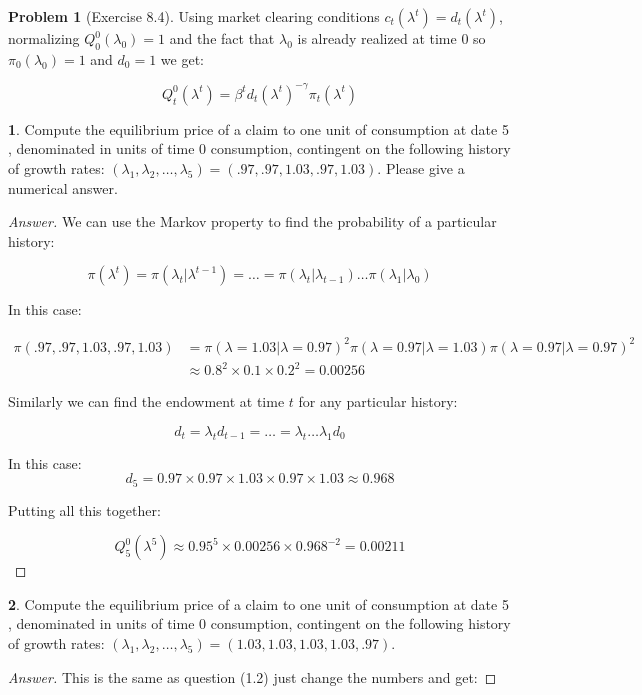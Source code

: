 \documentclass[12pt]{article}
\theoremstyle{definition}
\newtheorem{problem}{Problem}
\newtheorem{subproblem}{}[problem]
\begin{document}
\begin{problem}[Exercise 8.4]
Using market clearing conditions $c_t(\lambda^t) = d_t(\lambda^t)$, normalizing $Q^0_0(\lambda_0)=1$ and the fact that $\lambda_0$ is already realized at time $0$ so $\pi_{0}\left(\lambda_0\right) =1$ and $d_0= 1$ we get:

\begin{equation}\tag{1}\label{prices}
Q^0_t(\lambda^t) =  \beta^{t} d_{t}\left(\lambda^{t}\right)^{-\gamma} \pi_{t}\left(\lambda^{t}\right)
\end{equation}
 
\begin{subproblem}
Compute the equilibrium price of a claim to one unit of consumption at date 5 , denominated in units of time 0 consumption, contingent on the following history of growth rates: $\left(\lambda_{1}, \lambda_{2}, \ldots, \lambda_{5}\right)=(.97, .97,1.03, .97,1.03) .$ Please give a numerical answer.
\end{subproblem}

\begin{proof}[Answer]
We can use the Markov property to find the probability of a particular history:

$$\pi(\lambda^t) = \pi(\lambda_t|\lambda^{t-1})=\dots=\pi(\lambda_t|\lambda_{t-1})\dots\pi(\lambda_1|\lambda_{0})$$

In this case:

\begin{align*}
    \pi(.97, .97,1.03, .97, 1.03) &= \pi(\lambda = 1.03|\lambda = 0.97)^2\pi(\lambda = 0.97|\lambda = 1.03)\pi(\lambda = 0.97|\lambda = 0.97)^2\\
    & \approx 0.8^2 \times 0.1 \times 0.2^2 = 0.00256
\end{align*}

Similarly we can find the endowment at time $t$ for any particular history:

$$d_{t} = \lambda_{t}d_{t-1}=\ldots=\lambda_t\ldots\lambda_1d_0$$

In this case:
$$d_{5} = 0.97 \times 0.97 \times 1.03 \times 0.97 \times 1.03  \approx 0.968$$

Putting all this together:

$$Q^0_5(\lambda^5)  \approx 0.95^{5}\times0.00256\times 0.968^{-2} = 0.00211$$

\end{proof}
\begin{subproblem}
Compute the equilibrium price of a claim to one unit of consumption at date 5 , denominated in units of time 0 consumption, contingent on the following history of growth rates: $\left(\lambda_{1}, \lambda_{2}, \ldots, \lambda_{5}\right)=(1.03,1.03,1.03,1.03, .97)$.
\end{subproblem}
\begin{proof}[Answer]
This is the same as question (1.2) just change the numbers and get:


\end{proof}
\end{problem}
\end{document}
